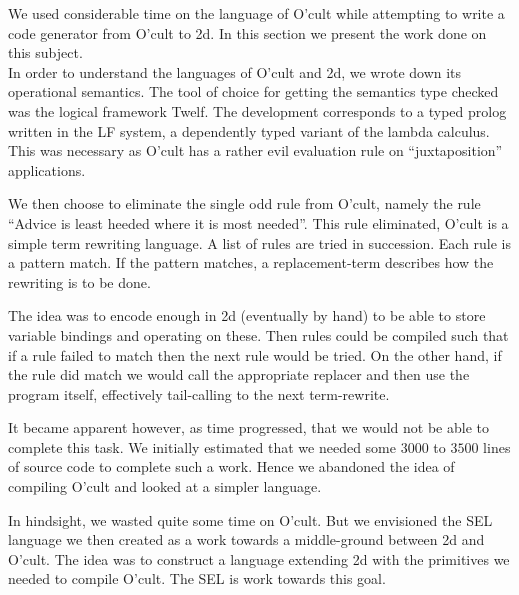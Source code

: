 
We used considerable time on the language of O'cult while attempting
to write a code generator from O'cult to 2d. In this section we
present the work done on this subject.\\

In order to understand the languages of O'cult and 2d, we wrote down
its operational semantics. The tool of choice for getting the
semantics type checked was the logical framework Twelf. The
development corresponds to a typed prolog written in the LF system, a
dependently typed variant of the lambda calculus. This was necessary
as O'cult has a rather evil evaluation rule on ``juxtaposition''
applications.

We then choose to eliminate the single odd rule from O'cult, namely
the rule ``Advice is least heeded where it is most needed''. This rule
eliminated, O'cult is a simple term rewriting language. A list of
rules are tried in succession. Each rule is a pattern match. If the
pattern matches, a replacement-term describes how the rewriting is to
be done.

The idea was to encode enough in 2d (eventually by hand) to be able to
store variable bindings and operating on these. Then rules could be
compiled such that if a rule failed to match then the next rule would
be tried. On the other hand, if the rule did match we would call the
appropriate replacer and then use the program itself, effectively
tail-calling to the next term-rewrite.

It became apparent however, as time progressed, that we would not be
able to complete this task. We initially estimated that we needed some
$3000$ to $3500$ lines of source code to complete such a work. Hence
we abandoned the idea of compiling O'cult and looked at a simpler
language.

In hindsight, we wasted quite some time on O'cult. But we envisioned
the SEL language we then created as a work towards a middle-ground
between 2d and O'cult. The idea was to construct a language extending
2d with the primitives we needed to compile O'cult. The SEL is work
towards this goal.


